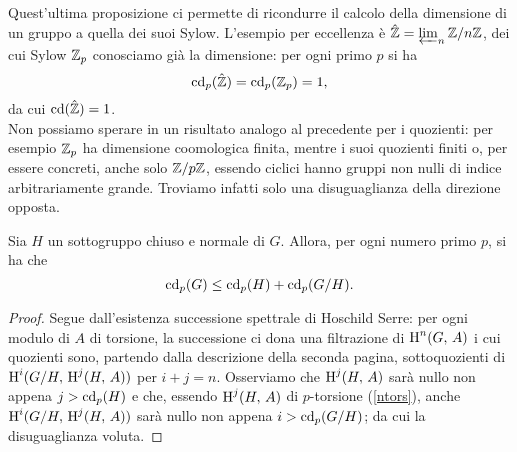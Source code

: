 Quest'ultima proposizione ci permette di ricondurre il calcolo della dimensione di un gruppo a quella dei suoi Sylow. L'esempio per eccellenza è $ \hat{\mathbb{Z}} = \varprojlim_n \mathbb{Z}/n\mathbb{Z} $, dei cui Sylow $ \mathbb{Z}_p$ conosciamo già la dimensione: per ogni primo $ p $ si ha
\[ \operatorname{cd}_p(\hat{\mathbb{Z}}) = \operatorname{cd}_p(\mathbb{Z}_p) = 1, \]
da cui $ \operatorname{cd}(\hat{\mathbb{Z}})=1 $.\\

Non possiamo sperare in un risultato analogo al precedente per i quozienti: per esempio $ \mathbb{Z}_p $ ha dimensione coomologica finita, mentre i suoi quozienti finiti o, per essere concreti, anche solo $ \mathbb{Z}/p\mathbb{Z} $, essendo ciclici hanno gruppi non nulli di indice arbitrariamente grande. Troviamo infatti solo una disuguaglianza della direzione opposta.
\begin{proposition}\label{quozienti}
	Sia $ H $ un sottogruppo chiuso e normale di $ G $. Allora, per ogni numero primo $ p $, si ha che
	\[ \operatorname{cd}_p(G) \leq \operatorname{cd}_p(H) + \operatorname{cd}_p(G/H). \]
\end{proposition}
\begin{proof}
	Segue dall'esistenza successione spettrale di Hoschild Serre: per ogni modulo di $ A $ di torsione, la successione ci dona una filtrazione di $ \operatorname{H}^n(G, \, A) $ i cui quozienti sono, partendo dalla descrizione della seconda pagina, sottoquozienti di $ \operatorname{H}^i(G/H, \, \operatorname{H}^j(H, \, A)) $ per $ i+j = n $. Osserviamo che $ \operatorname{H}^j(H, \, A) $ sarà nullo non appena $ j > \operatorname{cd}_p(H) $ e che, essendo $ \operatorname{H}^j(H, \, A) $ di $ p $-torsione (\ref{ntors}), anche $ \operatorname{H}^i(G/H, \, \operatorname{H}^j(H, \, A)) $ sarà nullo non appena $ i > \operatorname{cd}_p(G/H) $; da cui la disuguaglianza voluta.
\end{proof}